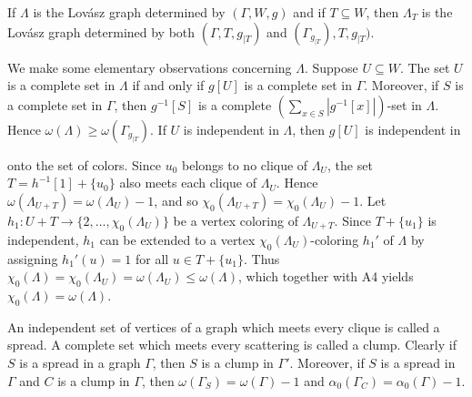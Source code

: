 If $\Lambda$ is the Lovász graph determined by $(\Gamma, W, g)$ and if $T \subseteq W$, then $\Lambda_T$ is the Lovász graph determined by both $(\Gamma, T, g_{|T})$ and $(\Gamma_{g_{|T}}), T, g_{|T})$.

We make some elementary observations concerning $\Lambda$. Suppose $U \subseteq W$. The set $U$ is a complete set in $\Lambda$ if and only if $g[U]$ is a complete set in $\Gamma$. Moreover, if $S$ is a complete set in $\Gamma$, then $g^{-1}[S]$ is a complete $(\sum_{x \in S} |g^{-1}[x]|)$-set in $\Lambda$. Hence $\omega(\Lambda) \geq \omega(\Gamma_{g_{|T}})$. If $U$ is independent in $\Lambda$, then $g[U]$ is independent in

onto the set of colors. Since $u_0$ belongs to no clique of $\Lambda_U$, the set $T = h^{-1}[1] + \{u_0\}$ also meets each clique of $\Lambda_U$. Hence $\omega(\Lambda_{U+T}) = \omega(\Lambda_U) - 1$, and so $\chi_0(\Lambda_{U+T}) = \chi_0(\Lambda_U) - 1$. Let $h_1: U + T \rightarrow \{2, \ldots, \chi_0(\Lambda_U)\}$ be a vertex coloring of $\Lambda_{U+T}$. Since $T + \{u_1\}$ is independent, $h_1$ can be extended to a vertex $\chi_0(\Lambda_U)$-coloring $h_1'$ of $\Lambda$ by assigning $h_1'(u) = 1$ for all $u \in T + \{u_1\}$. Thus $\chi_0(\Lambda) = \chi_0(\Lambda_U) = \omega(\Lambda_U) \leq \omega(\Lambda)$, which together with A4 yields $\chi_0(\Lambda) = \omega(\Lambda)$.

An independent set of vertices of a graph which meets every clique is called a spread. A complete set which meets every scattering is called a clump. Clearly if $S$ is a spread in a graph $\Gamma$, then $S$ is a clump in $\Gamma'$. Moreover, if $S$ is a spread in $\Gamma$ and $C$ is a clump in $\Gamma$, then $\omega(\Gamma_S) = \omega(\Gamma) - 1$ and $\alpha_0(\Gamma_C) = \alpha_0(\Gamma) - 1$.
